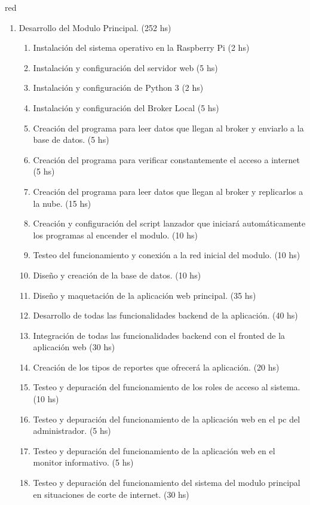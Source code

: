 \documentclass[11pt]{charter}
\begin{document}
\begin{consigna}{red}
\begin{enumerate}
\begin{enumerate}
	\item Realizar un informe de la configuración de red local instalada. (8 hs)
	\end{enumerate}
\item Desarrollo del Modulo Principal. (252 hs)
	\begin{enumerate}
	\item Instalación del sistema operativo en la Raspberry Pi (2 hs)
	\item Instalación y configuración del servidor web (5 hs)
	\item Instalación y configuración de Python 3 (2 hs)
	\item Instalación y configuración del Broker Local (5 hs)
	\item Creación del programa para leer datos que llegan al broker y enviarlo a la base de datos. (5 hs)
	\item Creación del programa para verificar constantemente el acceso a internet (5 hs)
	\item Creación del programa para leer datos que llegan al broker y replicarlos a la nube. (15 hs)
	\item Creación y configuración del script lanzador que iniciará automáticamente los programas al encender el modulo. (10 hs)
	\item Testeo del funcionamiento y conexión a la red inicial del modulo. (10 hs)
	\item Diseño y creación de la base de datos. (10 hs)
	\item Diseño y maquetación de la aplicación web principal. (35 hs)
	\item Desarrollo de todas las funcionalidades backend de la aplicación. (40 hs)
	\item Integración de todas las funcionalidades backend con el fronted de la aplicación web (30 hs)
	\item Creación de los tipos de reportes que ofrecerá la aplicación. (20 hs)
	\item Testeo y depuración del funcionamiento de los roles de acceso al sistema. (10 hs)
	\item Testeo y depuración del funcionamiento de la aplicación web en el pc del administrador. (5 hs)
	\item Testeo y depuración del funcionamiento de la aplicación web en el monitor informativo. (5 hs)
	\item Testeo y depuración del funcionamiento del sistema del modulo principal en situaciones de corte de internet. (30 hs) 

\end{enumerate}
\end{enumerate}
\end{consigna}
\end{document}
